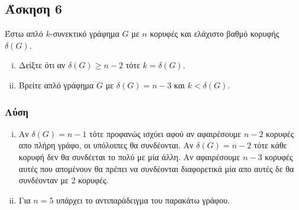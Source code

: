\subsection*{Άσκηση 6}

Έστω απλό $k$-συνεκτικό γράφημα $G$ με $n$ κορυφές και ελάχιστο βαθμό κορυφής $\delta(G)$.

\begin{enumerate}[(i)]
\item Δείξτε ότι αν $\delta(G) \ge n-2$ τότε $k = \delta(G)$.
\item Βρείτε απλό γράφημα $G$ με $\delta(G) = n - 3 $ και $k < \delta(G)$.
\end{enumerate}

\subsubsection*{Λύση}

\begin{enumerate}[(i)]
\item 

Aν $\delta(G) = n-1$ τότε προφανώς ισχύει αφού αν αφαιρέσουμε $n-2$ κορυφές απο πλήρη γράφο, οι υπόλοιπες
θα συνδέονται. Αν $\delta(G) = n-2$ τότε κάθε κορυφή δεν θα συνδέεται το πολύ με μία άλλη. Αν αφαιρέσουμε
$n-3$ κορυφές αυτές που απομένουν θα πρέπει να συνδέονται διαφορετικά μία απο αυτές δε θα συνδέονταν 
με 2 κορυφές.

\item
    Για $n=5$ υπάρχει το αντιπαράδειγμα του παρακάτω γράφου.

\end{enumerate}
